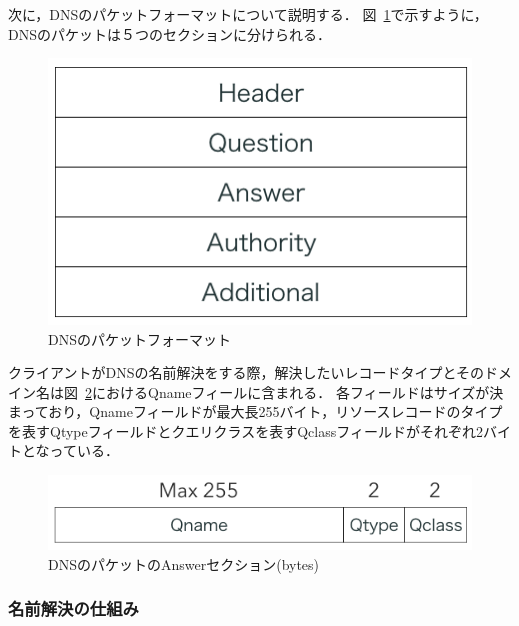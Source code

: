 次に，DNSのパケットフォーマットについて説明する．
図~\ref{fig:dns-format}で示すように，DNSのパケットは５つのセクションに分けられる．
\begin{figure}[bh]
 \centering
 \includegraphics[scale=0.7]{figure/dns-format.png}
 \caption{DNSのパケットフォーマット}
 \label{fig:dns-format}
\end{figure}
クライアントがDNSの名前解決をする際，解決したいレコードタイプとそのドメイン名は図~\ref{fig:dns-answer}におけるQnameフィールに含まれる．
各フィールドはサイズが決まっており，Qnameフィールドが最大長255バイト，リソースレコードのタイプを表すQtypeフィールドとクエリクラスを表すQclassフィールドがそれぞれ2バイトとなっている．
\begin{figure}[th]
 \centering
 \includegraphics[scale=0.6]{figure/dns-answer.png}
 \caption{DNSのパケットのAnswerセクション(bytes)}
 \label{fig:dns-answer}
\end{figure}

\subsubsection{名前解決の仕組み}
\label{sec:dns-mechanism}

